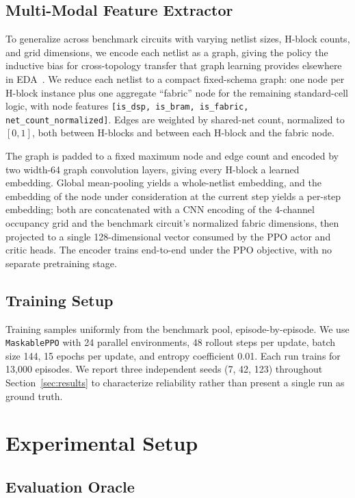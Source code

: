 \documentclass[sigconf]{acmart}
\begin{document}
\subsection{Multi-Modal Feature Extractor}
\label{sec:gnn}

To generalize across benchmark circuits with varying netlist sizes, H-block counts,
and grid dimensions, we encode each netlist as a graph, giving the policy the
inductive bias for cross-topology transfer that graph learning provides
elsewhere in EDA~\cite{gamora}. We reduce each netlist to a compact
fixed-schema graph: one node per H-block instance plus one aggregate
``fabric'' node for the remaining standard-cell logic, with node features
\texttt{[is\_dsp, is\_bram, is\_fabric, net\_count\_normalized]}. Edges are
weighted by shared-net count, normalized to $[0,1]$, both between
H-blocks and between each H-block and the fabric node.

The graph is padded to a fixed maximum node and edge count
 and encoded by two width-64 graph convolution
layers, giving every H-block a learned embedding. Global mean-pooling
yields a whole-netlist embedding, and the embedding of the node under
consideration at the current step yields a per-step embedding; both are
concatenated with a CNN encoding of the 4-channel occupancy grid and the
benchmark circuit's normalized fabric dimensions, then projected to a single
128-dimensional vector consumed by the PPO actor and critic heads. The
encoder trains end-to-end under the PPO objective, with no separate
pretraining stage.


\subsection{Training Setup}
\label{sec:training}

Training samples uniformly from the benchmark pool, episode-by-episode.
We use \texttt{MaskablePPO}
with 24 parallel environments, 48 rollout steps per update, batch size 144,
15 epochs per update, and entropy coefficient 0.01. Each run trains for 13{,}000 episodes.
 We report three independent seeds (7, 42,
123) throughout Section~\ref{sec:results} to characterize reliability rather
than present a single run as ground truth.

\section{Experimental Setup}
\label{sec:setup}

\subsection{Evaluation Oracle}
\label{sec:oracle}
\end{document}
